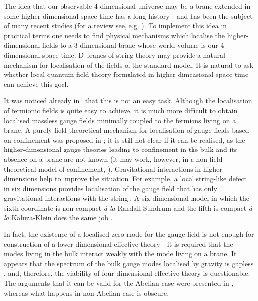 \documentclass[a4paper,12pt]{article}
\begin{document}
The idea that our observable 4-dimensional universe may be a brane
extended in some higher-dimensional space-time has a long history 
\cite{Rubakov:bb}-\cite{Randall:1999vf} and has been the subject of
many recent studies (for a review see, e.g. \cite{Rubakov:2001kp}). 
To implement this idea in practical terms one needs to find physical
mechanisms which localise the higher-dimensional fields to a
3-dimensional brane whose world volume is our 4-dimensional
space-time. D-branes of string theory \cite{Polchinski:1995mt} may
provide a natural mechanism for localisation of the fields of the
standard model. It is natural to ask whether local quantum field
theory formulated in higher dimensional space-time can achieve this
goal.

It was noticed already in~\cite{Rubakov:bb} that this is not an easy
task. Although the localisation of fermionic fields is quite easy to
achieve, it is much more difficult to obtain localised massless gauge
fields minimally coupled to the fermions living on a brane. A purely
field-theoretical mechanism for localisation of gauge fields based on
confinement was proposed in \cite{Dvali:1996xe}; it is still not
clear if it can be realised, as the higher-dimensional gauge theories
leading to confinement in the bulk and its absence on a brane are not
known (it may work, however, in a non-field theoretical  model of
confinement, \cite{Dubovsky:2001pe}).  Gravitational interactions in
higher dimensions help to improve the situation. For example, a local
string-like defect in six dimensions \cite{Gherghetta:2000qi}
provides localisation of the gauge field that has only gravitational
interactions with the string \cite{Oda:2000zc}. A six-dimensional
model in which the sixth coordinate is non-compact {\em \`a la}
Randall-Sundrum \cite{Randall:1999vf} and the fifth is compact {\em
\`a la} Kaluza-Klein does the same job \cite{Dubovsky:2000av}. 

In fact, the existence of a localised zero mode for the gauge field
is not enough for construction of a lower dimensional effective
theory - it is required that the modes living in the bulk interact
weakly with the mode living on a brane. It appears that the spectrum
of the bulk gauge modes localised by gravity is gapless
\cite{Dubovsky:2000av}, and, therefore, the viability of 
four-dimensional effective theory is questionable. The arguments that
it can be valid for the Abelian case were presented in
\cite{Dubovsky:2001pe}, whereas what happens in non-Abelian case is
obscure. 
\end{document}
